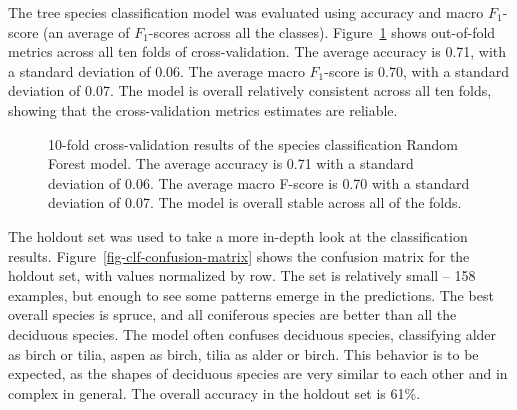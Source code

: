 The tree species classification model was evaluated using accuracy and macro $F_1$-score (an average of $F_1$-scores across all the classes).
Figure~\ref{fig-cv-clf} shows out-of-fold metrics across all ten folds of cross-validation.
The average accuracy is 0.71, with a standard deviation of 0.06.
The average macro $F_1$-score is 0.70, with a standard deviation of 0.07.
The model is overall relatively consistent across all ten folds, showing that the cross-validation metrics estimates are reliable.

\begin{figure}
\caption[Cross-validation results of the species classification Random Forest model]{\label{fig-cv-clf}10-fold cross-validation results of the
species classification Random Forest model. The average accuracy is 0.71
with a standard deviation of 0.06. The average macro F-score is 0.70
with a standard deviation of 0.07. The model is overall stable across
all of the folds.}
\end{figure}

The holdout set was used to take a more in-depth look at the classification results.
Figure~\ref{fig-clf-confusion-matrix} shows the confusion matrix for the holdout set, with values normalized by row.
The set is relatively small – 158 examples, but enough to see some patterns emerge in the predictions.
The best overall species is spruce, and all coniferous species are better than all the deciduous species.
The model often confuses deciduous species, classifying alder as birch or tilia, aspen as birch, tilia as alder or birch.
This behavior is to be expected, as the shapes of deciduous species are very similar to each other and in complex in general.
The overall accuracy in the holdout set is 61\%.

